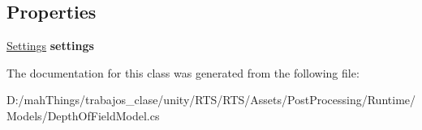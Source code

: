 \subsection*{Properties}
\begin{DoxyCompactItemize}
\item 
\mbox{\label{class_unity_engine_1_1_post_processing_1_1_depth_of_field_model_aa547c7750456651d57d3d4c2bfb91409}} 
\mbox{\hyperlink{struct_unity_engine_1_1_post_processing_1_1_depth_of_field_model_1_1_settings}{Settings}} {\bfseries settings}
\end{DoxyCompactItemize}


The documentation for this class was generated from the following file\+:\begin{DoxyCompactItemize}
\item 
D\+:/mah\+Things/trabajos\+\_\+clase/unity/\+R\+T\+S/\+R\+T\+S/\+Assets/\+Post\+Processing/\+Runtime/\+Models/Depth\+Of\+Field\+Model.\+cs\end{DoxyCompactItemize}
